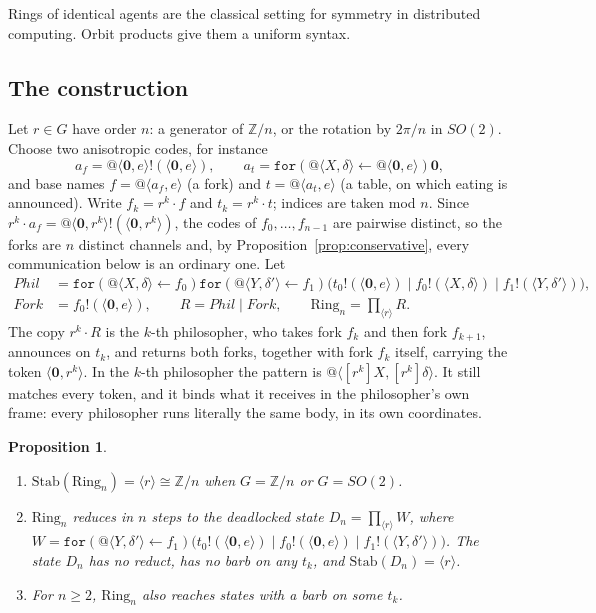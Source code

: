 \documentclass[11pt]{article}
\makeatletter
\newtheorem{proposition}[theorem]{Proposition}
\theoremstyle{definition}
\theoremstyle{remark}
\newcommand{\nil}{\mathbf{0}}
\newcommand{\rcv}[3]{\mathtt{for}(#1 \leftarrow #2)#3}
\newcommand{\out}[3]{#1!(\langle #2, #3\rangle)}
\newcommand{\qn}[2]{@\langle #1, #2\rangle}
\newcommand{\act}[2]{#1\cdot #2}
\newcommand{\Stab}{\mathrm{Stab}}
\newcommand{\ring}{\mathrm{Ring}}
\newcommand{\fr}[2]{[#1]#2}
\makeatother
\begin{document}
Rings of identical agents are the classical setting for symmetry in
distributed computing. Orbit products give them a uniform syntax.

\subsection{The construction}

Let $r\in G$ have order $n$: a generator of $\mathbb{Z}/n$, or the rotation by
$2\pi/n$ in $SO(2)$. Choose two anisotropic codes, for instance
\[
a_f=\out{\qn{\nil}{e}}{\nil}{e},
\qquad
a_t=\rcv{\qn{X}{\delta}}{\qn{\nil}{e}}{\nil},
\]
and base names $f=\qn{a_f}{e}$ (a fork) and $t=\qn{a_t}{e}$ (a table, on which
eating is announced). Write $f_k=\act{r^k}{f}$ and $t_k=\act{r^k}{t}$; indices
are taken mod $n$. Since $\act{r^k}{a_f}=\out{\qn{\nil}{r^k}}{\nil}{r^k}$, the
codes of $f_0,\dots,f_{n-1}$ are pairwise distinct, so the forks are $n$
distinct channels and, by Proposition~\ref{prop:conservative}, every
communication below is an ordinary one. Let
\begin{align*}
\mathit{Phil} &= \rcv{\qn{X}{\delta}}{f_0}{\rcv{\qn{Y}{\delta'}}{f_1}{\bigl(
  \out{t_0}{\nil}{e}\mid\out{f_0}{X}{\delta}\mid\out{f_1}{Y}{\delta'}\bigr)}},\\
\mathit{Fork} &= \out{f_0}{\nil}{e},
\qquad
R=\mathit{Phil}\mid\mathit{Fork},
\qquad
\ring_n=\textstyle\prod_{\langle r\rangle}R.
\end{align*}
The copy $\act{r^k}{R}$ is the $k$-th philosopher, who takes fork $f_k$ and
then fork $f_{k+1}$, announces on $t_k$, and returns both forks, together with
fork $f_k$ itself, carrying the token $\langle\nil,r^k\rangle$. In the
$k$-th philosopher the pattern is $\qn{\fr{r^k}{X}}{\fr{r^k}{\delta}}$. It
still matches every token, and it binds what it receives in the philosopher's
own frame: every philosopher runs literally the same body, in its own
coordinates.

\begin{proposition}\label{prop:ring}
\begin{enumerate}[label=(\roman*)]
\item $\Stab(\ring_n)=\langle r\rangle\cong\mathbb{Z}/n$ when $G=\mathbb{Z}/n$
  or $G=SO(2)$.
\item $\ring_n$ reduces in $n$ steps to the deadlocked state
  $D_n=\prod_{\langle r\rangle}W$, where
  $W=\rcv{\qn{Y}{\delta'}}{f_1}{\bigl(\out{t_0}{\nil}{e}\mid
  \out{f_0}{\nil}{e}\mid\out{f_1}{Y}{\delta'}\bigr)}$.
  The state $D_n$ has no reduct, has no barb on any $t_k$, and
  $\Stab(D_n)=\langle r\rangle$.
\item For $n\ge2$, $\ring_n$ also reaches states with a barb on some $t_k$.
\end{enumerate}
\end{proposition}
\end{document}
